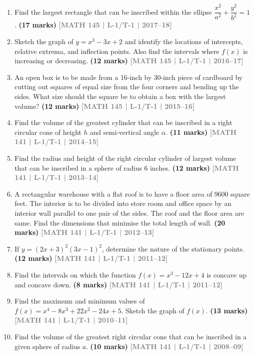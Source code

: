 \documentclass[12pt,a4paper]{article}
\newcommand{\yr}[1]{\hfill\textcolor{gray}{\small\textbf{[#1]}}}
\newcommand{\mk}[1]{\textcolor{orange!70!black}{\small\textbf{(#1 marks)}}}
\begin{document}
\begin{enumerate}
\item Find the largest rectangle that can be inscribed within the ellipse $\dfrac{x^{2}}{a^{2}}+\dfrac{y^{2}}{b^{2}}=1$.
\mk{17} \yr{MATH 145 | L-1/T-1 | 2017--18}

\item Sketch the graph of $y=x^{3}-3x+2$ and identify the locations of intercepts, relative extrema, and inflection points. Also find the intervals where $f(x)$ is increasing or decreasing.
\mk{12} \yr{MATH 145 | L-1/T-1 | 2016--17}

\item An open box is to be made from a 16-inch by 30-inch piece of cardboard by cutting out squares of equal size from the four corners and bending up the sides. What size should the square be to obtain a box with the largest volume?
\mk{12} \yr{MATH 145 | L-1/T-1 | 2015--16}

\item Find the volume of the greatest cylinder that can be inscribed in a right circular cone of height $h$ and semi-vertical angle $\alpha$.
\mk{11} \yr{MATH 141 | L-1/T-1 | 2014--15}

\item Find the radius and height of the right circular cylinder of largest volume that can be inscribed in a sphere of radius 6 inches.
\mk{12} \yr{MATH 141 | L-1/T-1 | 2013--14}

\item A rectangular warehouse with a flat roof is to have a floor area of 9600 square feet. The interior is to be divided into store room and office space by an interior wall parallel to one pair of the sides. The roof and the floor area are same. Find the dimensions that minimise the total length of wall.
\mk{20} \yr{MATH 141 | L-1/T-1 | 2012--13}

\item If $y=(2x+3)^{2}(3x-1)^{2}$, determine the nature of the stationary points.
\mk{12} \yr{MATH 141 | L-1/T-1 | 2011--12}

\item Find the intervals on which the function $f(x)=x^{3}-12x+4$ is concave up and concave down.
\mk{8} \yr{MATH 141 | L-1/T-1 | 2011--12}

\item Find the maximum and minimum values of $f(x)=x^{4}-8x^{3}+22x^{2}-24x+5$. Sketch the graph of $f(x)$.
\mk{13} \yr{MATH 141 | L-1/T-1 | 2010--11}

\item Find the volume of the greatest right circular cone that can be inscribed in a given sphere of radius $a$.
\mk{10} \yr{MATH 141 | L-1/T-1 | 2008--09}


\end{enumerate}
\end{document}
